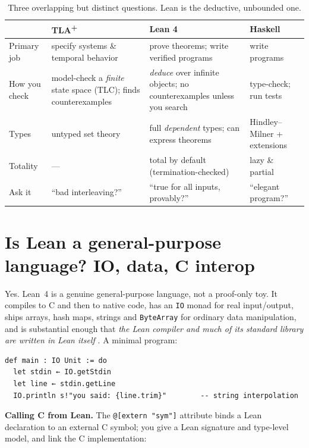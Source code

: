 \documentclass[11pt]{article}
\newcommand{\code}[1]{\lstinline[basicstyle=\ttfamily]|#1|}
\begin{document}
\begin{table}[t]
\centering\small
\begin{tabular}{@{}p{2.5cm}p{3.5cm}p{4.3cm}p{3.2cm}@{}}
\toprule
 & \textbf{TLA\textsuperscript{+}} & \textbf{Lean 4} & \textbf{Haskell}\\
\midrule
Primary job & specify systems \& temporal behavior & prove theorems; write
verified programs & write programs\\[2pt]
How you check & model-check a \emph{finite} state space (TLC); finds
counterexamples & \emph{deduce} over infinite objects; no counterexamples unless
you search & type-check; run tests\\[2pt]
Types & untyped set theory & full \emph{dependent} types; can express theorems &
Hindley--Milner + extensions\\[2pt]
Totality & --- & total by default (termination-checked) & lazy \& partial\\[2pt]
Ask it & ``bad interleaving?'' & ``true for all inputs, provably?'' &
``elegant program?''\\
\bottomrule
\end{tabular}
\caption{Three overlapping but distinct questions. Lean is the deductive,
unbounded one.}
\label{tab:compare}
\end{table}

\section{Is Lean a general-purpose language? IO, data, C interop}\label{sec:general}
Yes. Lean~4 is a genuine general-purpose language, not a proof-only toy. It
compiles to C and then to native code, has an \code{IO} monad for real
input/output, ships arrays, hash maps, strings and \code{ByteArray} for ordinary
data manipulation, and is substantial enough that \emph{the Lean compiler and
much of its standard library are written in Lean itself}
\cite{demoura-lean4}. A minimal program:

\begin{lstlisting}
def main : IO Unit := do
  let stdin ← IO.getStdin
  let line ← stdin.getLine
  IO.println s!"you said: {line.trim}"        -- string interpolation
\end{lstlisting}

\noindent \textbf{Calling C from Lean.} The \code{@[extern "sym"]} attribute
binds a Lean declaration to an external C symbol; you give a Lean signature and
type-level model, and link the C implementation:
\end{document}
